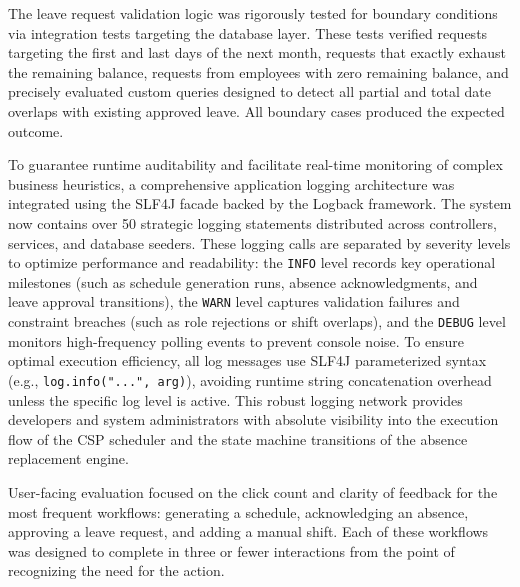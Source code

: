 \par The leave request validation logic was rigorously tested for boundary conditions via integration tests targeting the database layer. These tests verified requests targeting the first and last days of the next month, requests that exactly exhaust the remaining balance, requests from employees with zero remaining balance, and precisely evaluated custom queries designed to detect all partial and total date overlaps with existing approved leave. All boundary cases produced the expected outcome.

\par To guarantee runtime auditability and facilitate real-time monitoring of complex business heuristics, a comprehensive application logging architecture was integrated using the SLF4J facade backed by the Logback framework. The system now contains over 50 strategic logging statements distributed across controllers, services, and database seeders. These logging calls are separated by severity levels to optimize performance and readability: the \texttt{INFO} level records key operational milestones (such as schedule generation runs, absence acknowledgments, and leave approval transitions), the \texttt{WARN} level captures validation failures and constraint breaches (such as role rejections or shift overlaps), and the \texttt{DEBUG} level monitors high-frequency polling events to prevent console noise. To ensure optimal execution efficiency, all log messages use SLF4J parameterized syntax (e.g., \texttt{log.info("...", arg)}), avoiding runtime string concatenation overhead unless the specific log level is active. This robust logging network provides developers and system administrators with absolute visibility into the execution flow of the CSP scheduler and the state machine transitions of the absence replacement engine.

\par User-facing evaluation focused on the click count and clarity of feedback for the most frequent workflows: generating a schedule, acknowledging an absence, approving a leave request, and adding a manual shift. Each of these workflows was designed to complete in three or fewer interactions from the point of recognizing the need for the action.